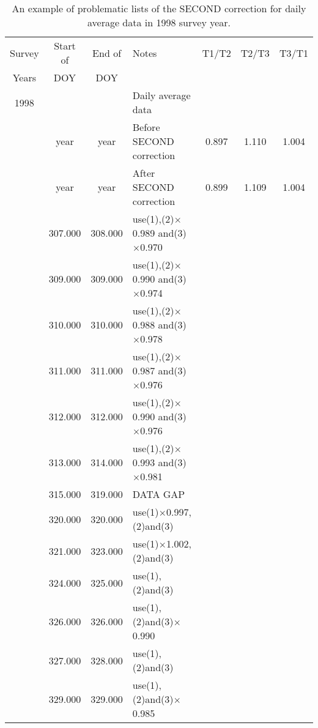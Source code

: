 \begin{table}[!h]
\centering \caption{An example of problematic lists of the SECOND
correction for daily average data in 1998 survey year.}
\label{problematiclists2}
    \begin{tabular}{ | c | c | c | p{5.5cm} | c | c | c |}
    \hline
    Survey & Start of & End of & Notes & T1/T2 & T2/T3 & T3/T1 \\ %
    Years & DOY & DOY &  &  &  &  \\ \hline
    1998 &      &      & Daily average data & & &
    \\ \hline
         & year & year & Before SECOND correction & 0.897 & 1.110 & 1.004\\
         & year & year & After SECOND correction & 0.899 & 1.109 &
         1.004\\ \hline
    &   307.000 &   308.000 &   use(1),(2)$\times$0.989 and(3)$\times$0.970    &       &       &       \\
    &   309.000 &   309.000 &   use(1),(2)$\times$0.990 and(3)$\times$0.974    &       &       &       \\
    &   310.000 &   310.000 &   use(1),(2)$\times$0.988 and(3)$\times$0.978    &       &       &       \\
    &   311.000 &   311.000 &   use(1),(2)$\times$0.987 and(3)$\times$0.976    &       &       &       \\
    &   312.000 &   312.000 &   use(1),(2)$\times$0.990 and(3)$\times$0.976    &       &       &       \\
    &   313.000 &   314.000 &   use(1),(2)$\times$0.993 and(3)$\times$0.981    &       &       &       \\
    &   315.000 &   319.000 &   DATA GAP    &       &       &       \\
    &   320.000 &   320.000 &   use(1)$\times$0.997,(2)and(3)  &       &       &       \\
    &   321.000 &   323.000 &   use(1)$\times$1.002,(2)and(3)  &       &       &       \\
    &   324.000 &   325.000 &   use(1),(2)and(3) &       &       &       \\
    &   326.000 &   326.000 &   use(1),(2)and(3)$\times$0.990  &       &       &       \\
    &   327.000 &   328.000 &   use(1),(2)and(3) &       &       &       \\
    &   329.000 &   329.000 &   use(1),(2)and(3)$\times$0.985  &       &       &       \\

\end{tabular}
\end{table}
